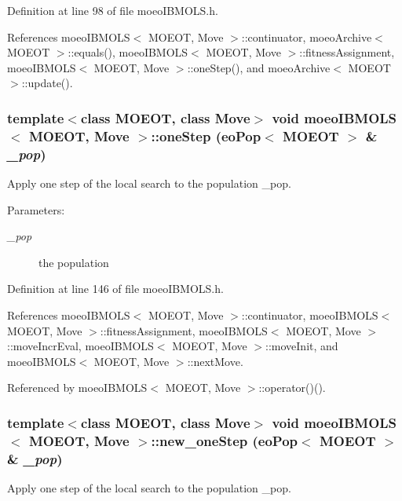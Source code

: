 Definition at line 98 of file moeo\-IBMOLS.h.

References moeo\-IBMOLS$<$ MOEOT, Move $>$::continuator, moeo\-Archive$<$ MOEOT $>$::equals(), moeo\-IBMOLS$<$ MOEOT, Move $>$::fitness\-Assignment, moeo\-IBMOLS$<$ MOEOT, Move $>$::one\-Step(), and moeo\-Archive$<$ MOEOT $>$::update().
\subsubsection{\setlength{\rightskip}{0pt plus 5cm}template$<$class MOEOT, class Move$>$ void \bf{moeo\-IBMOLS}$<$ MOEOT, Move $>$::one\-Step (\bf{eo\-Pop}$<$ MOEOT $>$ \& {\em \_\-pop})\hspace{0.3cm}{\tt  [inline, private]}}\label{classmoeoIBMOLS_fce770398602972b5d67c52638687d43}


Apply one step of the local search to the population \_\-pop. 

\begin{Desc}
\item[Parameters:]
\begin{description}
\item[{\em \_\-pop}]the population \end{description}
\end{Desc}


Definition at line 146 of file moeo\-IBMOLS.h.

References moeo\-IBMOLS$<$ MOEOT, Move $>$::continuator, moeo\-IBMOLS$<$ MOEOT, Move $>$::fitness\-Assignment, moeo\-IBMOLS$<$ MOEOT, Move $>$::move\-Incr\-Eval, moeo\-IBMOLS$<$ MOEOT, Move $>$::move\-Init, and moeo\-IBMOLS$<$ MOEOT, Move $>$::next\-Move.

Referenced by moeo\-IBMOLS$<$ MOEOT, Move $>$::operator()().
\subsubsection{\setlength{\rightskip}{0pt plus 5cm}template$<$class MOEOT, class Move$>$ void \bf{moeo\-IBMOLS}$<$ MOEOT, Move $>$::new\_\-one\-Step (\bf{eo\-Pop}$<$ MOEOT $>$ \& {\em \_\-pop})\hspace{0.3cm}{\tt  [inline, private]}}\label{classmoeoIBMOLS_9d811733d8e7508a7c48615c8ff0f990}


Apply one step of the local search to the population \_\-pop. 

